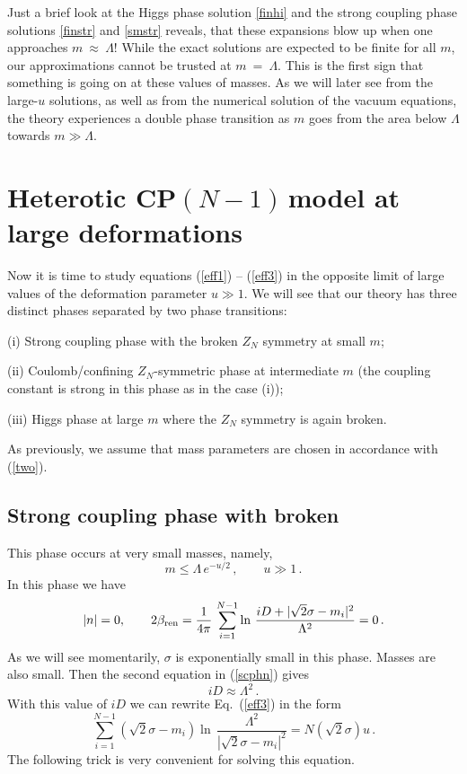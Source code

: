 \documentclass[epsfig,12pt]{article}
\def\beq{\begin{equation}}
\def\eeq{\end{equation}}
\newcommand{\cpn}{CP$(N-1)\,$}
\def\beq{\begin{equation}}
\def\eeq{\end{equation}}
\begin{document}
{	Just a brief look at the Higgs phase solution \eqref{finhi} and the strong coupling phase solutions
	\eqref{finstr} and \eqref{smstr} reveals, that these expansions blow up 
	when one approaches $ m ~\approx~ \Lambda $! 
	While the exact solutions are expected to be finite for all $m$, our approximations cannot be trusted
	at $ m ~=~ \Lambda $.
	This is the first sign that something is going on at these values of masses.
	As we will later see from the large-$u$ solutions, as well as from the numerical solution of the 
	vacuum equations, the theory experiences a double phase transition as $m$ goes from the area
	below $ \Lambda $ towards $ m \gg \Lambda $.


\section{ Heterotic \cpn model at large  deformations}
\label{hetdefld}
\setcounter{equation}{0}

Now it is time to study equations (\ref{eff1}) -- (\ref{eff3}) in the opposite limit of large values of 
the deformation parameter $u\gg 1$. We will see that our theory has three distinct phases 
separated by two phase transitions:

\vspace{1mm}

 (i) Strong coupling phase  with the broken $Z_N$
symmetry at small $m$;

(ii)  Coulomb/confining $Z_N$-symmetric
phase at intermediate $m$ (the coupling constant is strong in this phase as in the case (i)); 

(iii) Higgs phase
at large $m$ where the $Z_N$ symmetry is again broken.

\vspace{1mm}

As previously,  we assume that mass parameters are chosen in accordance with
(\ref{two}).

\subsection{ Strong coupling phase with broken }
\label{scpwbz}

This phase occurs at very small masses, namely,
\beq
m\le \Lambda\,e^{-u/2}\,,\qquad u\gg 1\,.
\label{scphmass}
\eeq
In this phase we have 
\beq
|n|=0,\qquad 2\beta_{\rm ren}=\frac{1}{4\pi}\, 
\sum_{i=1}^{N-1}\ln\, {\frac{iD +|\sqrt{2}\sigma-m_i|^2}{\Lambda^2}} =0\, .
\label{scphn}
\eeq
As we will see momentarily,  $\sigma$ is exponentially small in this phase. Masses are also
small. Then the second equation in (\ref{scphn}) gives
\beq
iD\approx \Lambda^2 \,.
\label{scphD}
\eeq
With this value of $iD$ we can rewrite Eq.~(\ref{eff3}) in the form
\beq
 \sum_{i=1}^{N-1}\left(\sqrt{2}\sigma-m_i\right)\ln\, {\frac{\Lambda^2}{\left|\sqrt{2}\sigma-m_i\right|^2}}
=N\left(\sqrt{2}\sigma\right)u\,.
\label{scpheq3}
\eeq
The following trick is very convenient for solving this equation.

}
\end{document}
